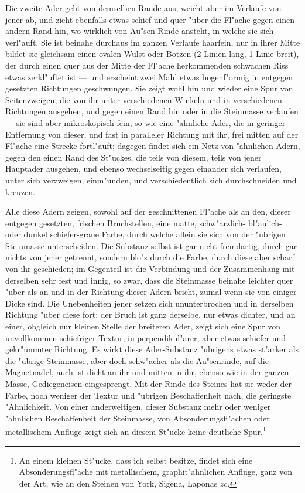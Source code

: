 \documentclass[a4paper, 11pt, oneside, german]{article}
\begin{document}
Die zweite Ader geht von demselben Rande aus, weicht aber im Verlaufe von jener ab, und zieht ebenfalls etwas schief und quer "uber die Fl"ache gegen einen andern Rand hin, wo wirklich von Au"sen Rinde ansteht, in welche sie sich verl"auft. Sie ist beinahe durchaus im ganzen Verlaufe haarfein, nur in ihrer Mitte bildet sie gleichsam einen ovalen Wulst oder Botzen (2 Linien lang, 1 Linie breit), der durch einen quer aus der Mitte der Fl"ache herkommenden schwachen Riss etwas zerkl"uftet ist --- und erscheint zwei Mahl etwas bogenf"ormig in entgegen gesetzten Richtungen geschwungen. Sie zeigt wohl hin und wieder eine Spur von Seitenzweigen, die von ihr unter verschiedenen Winkeln und in verschiedenen Richtungen ausgehen, und gegen einen Rand hin oder in die Steinmasse verlaufen --- sie sind aber mikroskopisch fein, so wie eine "ahnliche Ader, die in geringer Entfernung von dieser, und fast in paralleler Richtung mit ihr, frei mitten auf der Fl"ache eine Strecke fortl"auft; dagegen findet sich ein Netz von "ahnlichen Adern, gegen den einen Rand des St"uckes, die teils von diesem, teils von jener Hauptader ausgehen, und ebenso wechselseitig gegen einander sich verlaufen, unter sich verzweigen, einm"unden, und verschiedentlich sich durchschneiden und kreuzen.

Alle diese Adern zeigen, sowohl auf der geschnittenen Fl"ache als an den, dieser entgegen gesetzten, frischen Bruchstellen, eine matte, schw"arzlich- bl"aulich- oder dunkel schiefer-graue Farbe, durch welche allein sie sich von der "ubrigen Steinmasse unterscheiden. Die Substanz selbst ist gar nicht fremdartig, durch gar nichts von jener getrennt, sondern blo"s durch die Farbe, durch diese aber scharf von ihr geschieden; im Gegenteil ist die Verbindung und der Zusammenhang mit derselben sehr fest und innig, so zwar, dass die Steinmasse beinahe leichter quer "uber als an und in der Richtung dieser Adern bricht, zumal wenn sie von einiger Dicke sind. Die Unebenheiten jener setzen sich ununterbrochen und in derselben Richtung "uber diese fort; der Bruch ist ganz derselbe, nur etwas dichter, und an einer, obgleich nur kleinen Stelle der breiteren Ader, zeigt sich eine Spur von unvollkommen schiefriger Textur, in perpendikul"arer, aber etwas schiefer und gekr"ummter Richtung. Es wirkt diese Ader-Substanz "ubrigens etwas st"arker als die "ubrige Steinmasse, aber doch schw"acher als die Au"senrinde, auf die Magnetnadel, auch ist dicht an ihr und mitten in ihr, ebenso wie in der ganzen Masse, Gediegeneisen eingesprengt. Mit der Rinde des Steines hat sie weder der Farbe, noch weniger der Textur und "ubrigen Beschaffenheit nach, die geringste "Ahnlichkeit. Von einer anderweitigen, dieser Substanz mehr oder weniger "ahnlichen Beschaffenheit der Steinmasse, von Absonderungsfl"achen oder metallischem Anfluge zeigt sich an diesem St"ucke keine deutliche Spur.\footnote{An einem kleinen St"ucke, dass ich selbst besitze, findet sich eine Absonderungsfl"ache mit metallischem, graphit"ahnlichen Anfluge, ganz von der Art, wie an den Steinen von York, Sigena, Laponas \emph{zc.}}
\end{document}
